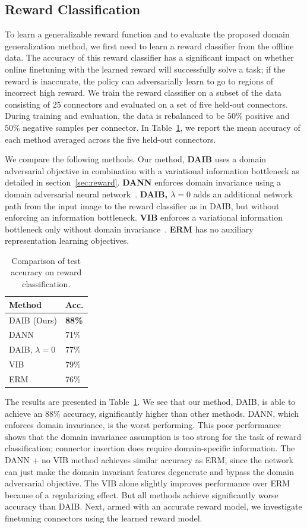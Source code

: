 \documentclass[letterpaper, 10 pt, conference, final]{ieeeconf}   %
\begin{document}
\subsection{Reward Classification}

To learn a generalizable reward function and to evaluate the proposed domain generalization method, we first need to learn a reward classifier from the offline data. 
The accuracy of this reward classifier has a significant impact on whether online finetuning with the learned reward will successfully solve a task; if the reward is inaccurate, the policy can adversarially learn to go to regions of incorrect high reward.
We train the reward classifier on a subset of the data consisting of 25 connectors and evaluated on a set of five held-out connectors.
During training and evaluation, the data is rebalanced to be $50\%$ positive and $50\%$ negative samples per connector.
In Table~\ref{tab:reward}, we report the mean accuracy of each method averaged across the five held-out connectors.

We compare the following methods.
Our method, \textbf{DAIB} uses a domain adversarial objective in combination with a variational information bottleneck as detailed in section~\ref{sec:reward}. \textbf{DANN} enforces domain invariance using a domain adversarial neural network~\cite{ganin2016domainadversarial}. \textbf{DAIB, $\lambda=0$} adds an additional network path from the input image to the reward classifier as in DAIB, but without enforcing an information bottleneck. \textbf{VIB} enforces a variational information bottleneck only without domain invariance~\cite{alemi2017vib}. \textbf{ERM} has no auxiliary representation learning objectives.

\begin{table}
\begin{tabular}{l|l}
Method   & Acc. \\ \hline
DAIB (Ours) & \textbf{88\%}     \\
DANN          & 71\%     \\
DAIB, $\lambda=0$    & 77\%     \\
VIB         & 79\%     \\
ERM             & 76\%    
\end{tabular}
\caption{Comparison of test accuracy on reward classification.}
\label{tab:reward}
\end{table}
The results are presented in Table~\ref{tab:reward}. We see that our method, DAIB, is able to achieve an $88\%$ accuracy, significantly higher than other methods. DANN, which enforces domain invariance, is the worst performing. This poor performance shows that the domain invariance assumption is too strong for the task of reward classification; connector insertion does require domain-specific information. The DANN + no VIB
method achieves similar accuracy as ERM, since the network can just make the domain invariant features degenerate and bypass the domain adversarial objective.
The VIB alone slightly improves performance over ERM because of a regularizing effect. But all methods achieve significantly worse accuracy than DAIB. Next, armed with an accurate reward model, we investigate finetuning connectors using the learned reward model.
\end{document}
